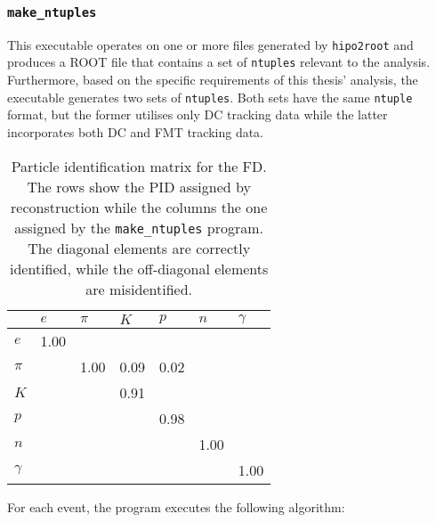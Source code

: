 \subsubsection{\texttt{make\_ntuples}}
\label{13.14::make_ntuples}
    This executable operates on one or more files generated by \texttt{hipo2root} and produces a ROOT file that contains a set of \texttt{ntuples} relevant to the analysis.
    Furthermore, based on the specific requirements of this thesis' analysis, the executable generates two sets of \texttt{ntuples}.
    Both sets have the same \texttt{ntuple} format, but the former utilises only DC tracking data while the latter incorporates both DC and FMT tracking data.

    \begin{table}
        \caption{Particle identification matrix for the FD.
        The rows show the PID assigned by reconstruction while the columns the one assigned by the \texttt{make\_ntuples} program.
        The diagonal elements are correctly identified, while the off-diagonal elements are misidentified.}

        \begin{center}
            \begin{tabularx}{240pt}{Xllllll}
                \toprule
                         & $e$      & $\pi$ & $K$  & $p$  & $n$  & $\gamma$ \\
                \midrule
                $e$      & 1.00     &       &      &      &      &          \\
                $\pi$    &          & 1.00  & 0.09 & 0.02 &      &          \\
                $K$      &          &       & 0.91 &      &      &          \\
                $p$      &          &       &      & 0.98 &      &          \\
                $n$      &          &       &      &      & 1.00 &          \\
                $\gamma$ &          &       &      &      &      & 1.00     \\
                \bottomrule
            \end{tabularx}
        \end{center}
        \label{tab::13.14::make_ntuples_pid}
    \end{table}

    For each event, the program executes the following algorithm:

